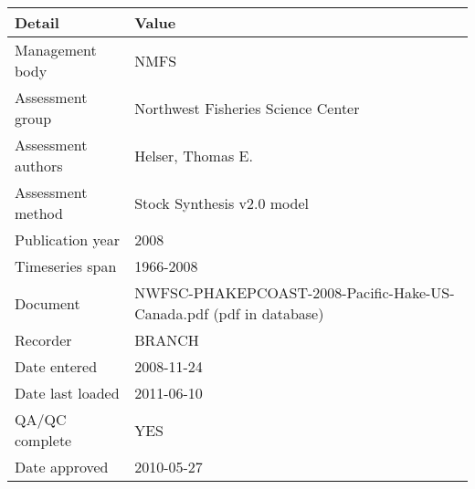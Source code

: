 \begin{table}[htb]
\centering
\begin{tabular}{lp{7cm}}
\toprule
Detail & Value \\
\midrule
Management body    & NMFS                                                                \\
Assessment group   & Northwest Fisheries Science Center                                  \\
Assessment authors & Helser, Thomas E.                                                   \\
Assessment method  & Stock Synthesis v2.0 model                                          \\
Publication year   & 2008                                                                \\
Timeseries span    & 1966-2008                                                           \\
Document           & NWFSC-PHAKEPCOAST-2008-Pacific-Hake-US-Canada.pdf (pdf in database) \\
Recorder           & BRANCH                                                              \\
Date entered       & 2008-11-24                                                          \\
Date last loaded   & 2011-06-10                                                          \\
QA/QC complete     & YES                                                                 \\
Date approved      & 2010-05-27                                                          \\
\bottomrule
\end{tabular}
\label{tab:assessdet}
\end{table}
